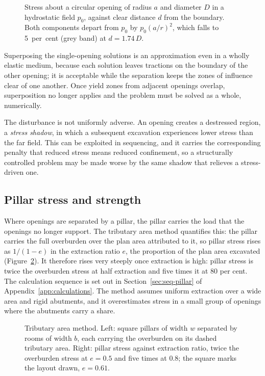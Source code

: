 \begin{figure}[htbp]
\centering
{}
\caption{Stress about a circular opening of radius $a$ and diameter $D$ in a hydrostatic field $p_0$, against clear distance $d$ from the boundary. Both components depart from $p_0$ by $p_0(a/r)^2$, which falls to 5~per~cent (grey band) at $d = 1.74\,D$.}
\label{fig:zone-of-influence}
\end{figure}

Superposing the single-opening solutions is an approximation even in a wholly
elastic medium, because each solution leaves tractions on the boundary of the
other opening; it is acceptable while the separation keeps the zones of
influence clear of one another. Once yield zones from adjacent openings
overlap, superposition no longer applies and the problem must be solved as a
whole, numerically.

The disturbance is not uniformly adverse. An opening creates a destressed
region, a \emph{stress shadow}, in which a subsequent excavation experiences
lower stress than the far field. This can be exploited in sequencing, and it
carries the corresponding penalty that reduced stress means reduced
confinement, so a structurally controlled problem may be made worse by the
same shadow that relieves a stress-driven one.

\subsection{Pillar stress and strength}
\label{sec:pillar-stress-strength}

Where openings are separated by a pillar, the pillar carries the load that the
openings no longer support. The tributary area method quantifies this: the
pillar carries the full overburden over the plan area attributed to it, so
pillar stress rises as $1/(1-e)$ in the extraction ratio $e$, the proportion
of the plan area excavated (Figure~\ref{fig:pillar-stress}). It therefore rises very steeply once extraction is
high: pillar stress is twice the overburden stress at half extraction and
five times it at 80 per cent. The calculation sequence is set out in
Section~\ref{sec:seq-pillar} of Appendix~\ref{app:calculations}. The method assumes uniform extraction over a wide area and rigid
abutments, and it overestimates stress in a small group of openings where the
abutments carry a share.

\begin{figure}[htbp]
\centering
{}
\caption{Tributary area method. Left: square pillars of width $w$ separated by rooms of width $b$, each carrying the overburden on its dashed tributary area. Right: pillar stress against extraction ratio, twice the overburden stress at $e = 0.5$ and five times at 0.8; the square marks the layout drawn, $e = 0.61$.}
\label{fig:pillar-stress}
\end{figure}

